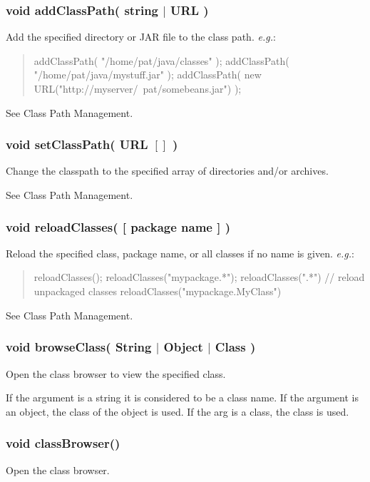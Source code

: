 \documentclass[twoside,11pt,nolof]{starlink}
\providecommand{\eg}{\textit{e.g.}}
\begin{document}
\subsubsection*{void addClassPath( string $|$ URL )}
Add the specified directory or JAR file to the class path. \eg:
\begin{quote}
\begin{terminalv}
    addClassPath( "/home/pat/java/classes" );
    addClassPath( "/home/pat/java/mystuff.jar" );
    addClassPath( new URL("http://myserver/~pat/somebeans.jar") );
\end{terminalv}
\end{quote}
See Class Path Management.

\subsubsection*{void setClassPath( URL $[]$ )}
Change the classpath to the specified array of directories and/or archives.

See Class Path Management.

\subsubsection*{void reloadClasses( [ package name ] )}
Reload the specified class, package name, or all classes if no name is
given. \eg:
\begin{quote}
\begin{terminalv}
    reloadClasses();
    reloadClasses("mypackage.*");
    reloadClasses(".*")  // reload unpackaged classes
    reloadClasses("mypackage.MyClass")
\end{terminalv}
\end{quote}

See Class Path Management.

\subsubsection*{void browseClass( String $|$ Object $|$ Class )}
Open the class browser to view the specified class.

If the argument is a string it is considered to be a class name.
If the argument is an object, the class of the object is used.
If the arg is a class, the class is used.

\subsubsection*{void classBrowser()}
Open the class browser.
\end{document}
